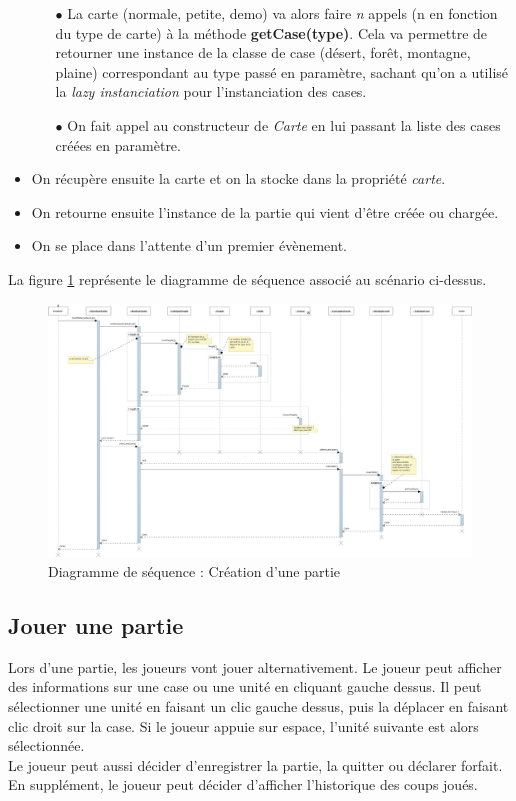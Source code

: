 \documentclass[a4paper,11pt]{article}
\begin{document}
\begin{itemize}
\begin{itemize}
	\item[$\bullet$] La carte (normale, petite, demo) va alors faire \textit{n} appels (n en fonction du type de carte) à la méthode \textbf{getCase(type)}. Cela va permettre de retourner une instance de la classe de case (désert, forêt, montagne, plaine) correspondant au type passé en paramètre, sachant qu'on a utilisé la \textit{lazy instanciation} pour l'instanciation des cases.
	\item[$\bullet$] On fait appel au constructeur de \textit{Carte} en lui passant la liste des cases créées en paramètre.
	\end{itemize}
\item On récupère ensuite la carte et on la stocke dans la propriété \textit{carte}.
\item On retourne ensuite l'instance de la partie qui vient d'être créée ou chargée. 
\item On se place dans l'attente d'un premier évènement.
\end{itemize}
\medskip
La figure \ref{ds:cp} représente le diagramme de séquence associé au scénario ci-dessus.
\begin{figure}[H]
	\centering
	\includegraphics[width=\textwidth]{fig/diagramme_sequence_creerPartie}
	\caption{Diagramme de séquence : Création d'une partie}
	\label{ds:cp}
\end{figure} 
\subsection{Jouer une partie}
Lors d'une partie, les joueurs vont jouer alternativement. Le joueur peut afficher des informations sur une case ou une unité en cliquant gauche dessus. Il peut sélectionner une unité en faisant un clic gauche dessus, puis la déplacer en faisant clic droit sur la case. Si le joueur appuie sur espace, l'unité suivante est alors sélectionnée. \\
Le joueur peut aussi décider d'enregistrer la partie, la quitter ou déclarer forfait.\\
En supplément, le joueur peut décider d'afficher l'historique des coups joués.
\end{document}
